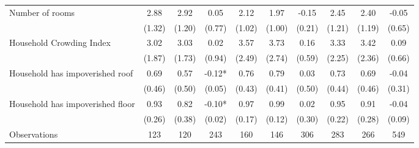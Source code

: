 \begin{tabular}{l*{9}c}
Number of rooms&2.88&2.92&0.05&2.12&1.97&-0.15&2.45&2.40&-0.05\\
&(1.32)&(1.20)&(0.77)&(1.02)&(1.00)&(0.21)&(1.21)&(1.19)&(0.65)\\
Household Crowding Index&3.02&3.03&0.02&3.57&3.73&0.16&3.33&3.42&0.09\\
&(1.87)&(1.73)&(0.94)&(2.49)&(2.74)&(0.59)&(2.25)&(2.36)&(0.66)\\
Household has impoverished roof&0.69&0.57&-0.12*&0.76&0.79&0.03&0.73&0.69&-0.04\\
&(0.46)&(0.50)&(0.05)&(0.43)&(0.41)&(0.50)&(0.44)&(0.46)&(0.31)\\
Household has impoverished floor&0.93&0.82&-0.10*&0.97&0.99&0.02&0.95&0.91&-0.04\\
&(0.26)&(0.38)&(0.02)&(0.17)&(0.12)&(0.30)&(0.22)&(0.28)&(0.09)\\
\hline
Observations & 123 & 120 & 243 & 160 & 146 & 306 & 283 & 266 & 549 \\
\hline\hline
\end{tabular}
